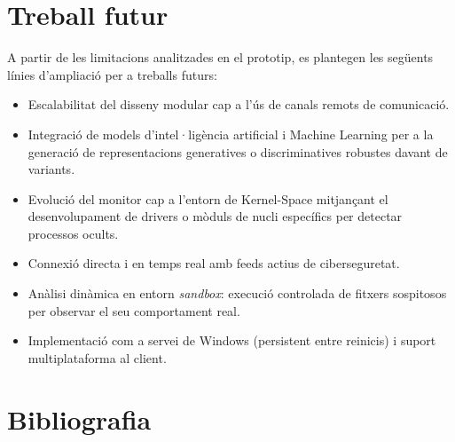 \documentclass[12pt,a4paper]{report}
\begin{document}
\chapter{Treball futur}
\label{ch:treballfutur}
A partir de les limitacions analitzades en el prototip, es plantegen les següents línies d'ampliació per a treballs futurs:
\begin{itemize}
    \item Escalabilitat del disseny modular cap a l'ús de canals remots de comunicació.
    \item Integració de models d'intel·ligència artificial i Machine Learning per a la generació de representacions generatives o discriminatives robustes davant de variants.
    \item Evolució del monitor cap a l'entorn de Kernel-Space mitjançant el desenvolupament de drivers o mòduls de nucli específics per detectar processos ocults.
    \item Connexió directa i en temps real amb feeds actius de ciberseguretat.
    \item Anàlisi dinàmica en entorn \textit{sandbox}: execució controlada de fitxers sospitosos per observar el seu comportament real.
    \item Implementació com a servei de Windows (persistent entre reinicis) i suport multiplataforma al client.
\end{itemize}


\chapter{Bibliografia}
\label{ch:bibliografia}
\end{document}
